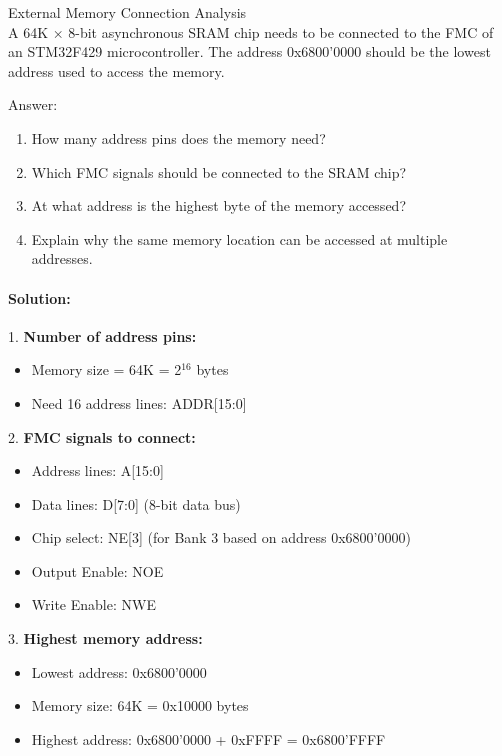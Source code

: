 \begin{example2}{External Memory Connection Analysis}\\
A 64K × 8-bit asynchronous SRAM chip needs to be connected to the FMC of an STM32F429 microcontroller. The address 0x6800'0000 should be the lowest address used to access the memory.

Answer:
\begin{enumerate}
    \item How many address pins does the memory need?
    \item Which FMC signals should be connected to the SRAM chip?
    \item At what address is the highest byte of the memory accessed?
    \item Explain why the same memory location can be accessed at multiple addresses.
\end{enumerate}

\tcblower
\paragraph{Solution:}

1. \textbf{Number of address pins:}
   \begin{itemize}
     \item Memory size = 64K = 2$^{16}$ bytes
     \item Need 16 address lines: ADDR[15:0]
   \end{itemize}

2. \textbf{FMC signals to connect:}
   \begin{itemize}
     \item Address lines: A[15:0]
     \item Data lines: D[7:0] (8-bit data bus)
     \item Chip select: NE[3] (for Bank 3 based on address 0x6800'0000)
     \item Output Enable: NOE
     \item Write Enable: NWE
   \end{itemize}

3. \textbf{Highest memory address:}
   \begin{itemize}
     \item Lowest address: 0x6800'0000
     \item Memory size: 64K = 0x10000 bytes
     \item Highest address: 0x6800'0000 + 0xFFFF = 0x6800'FFFF
   \end{itemize}


\end{example2}
